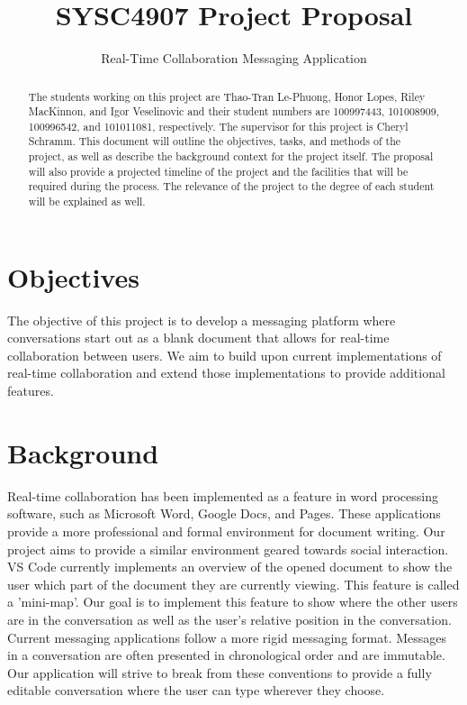\documentclass[letterpaper,12pt]{report}
\begin{document}
	\title{SYSC4907 Project Proposal}
	\author{Real-Time Collaboration Messaging Application}
	\date{}
	\maketitle

	\begin{abstract}
		The students working on this project are Thao-Tran Le-Phuong, Honor
		Lopes, Riley MacKinnon, and Igor Veselinovic and their student numbers
		are 100997443, 101008909, 100996542, and 101011081, respectively. The
		supervisor for this project is Cheryl Schramm. This document will
		outline the objectives, tasks, and methods of the project, as well as
		describe the background context for the project itself. The proposal
		will also provide a projected timeline of the project and the
		facilities that will be required during the process. The relevance of
		the project to the degree of each student will be explained as well.
	\end{abstract}

	\tableofcontents

	\pagebreak

	\section*{Objectives}
	\markright{}
	The objective of this project is to develop a messaging platform where
	conversations start out as a blank document that allows for real-time
	collaboration between users. We aim to build upon current implementations
	of real-time collaboration and extend those implementations to provide
	additional features.

	\section*{Background}
	\markright{}
	Real-time collaboration has been implemented as a feature in word
	processing software, such as Microsoft Word, Google Docs, and Pages. These
	applications provide a more professional and formal environment for
	document writing. Our project aims to provide a similar environment geared
	towards social interaction. VS Code currently implements an overview of the
	opened document to show the user which part of the document they are
	currently viewing. This feature is called a 'mini-map'. Our goal is to
	implement this feature to show where the other users are in the
	conversation as well as the user's relative position in the conversation.
	Current messaging applications follow a more rigid messaging format.
	Messages in a conversation are often presented in chronological order and 
	are immutable. Our application will strive to break from these conventions
	to provide a fully editable conversation where the user can type wherever
	they choose.
\end{document}
